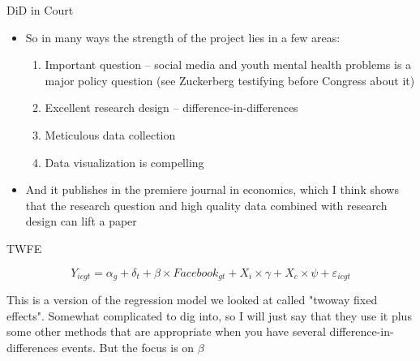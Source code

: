 \documentclass{beamer}
\begin{document}
\begin{frame}{DiD in Court}

\begin{itemize}

\item So in many ways the strength of the project lies in a few areas:
	\begin{enumerate}
	\item Important question -- social media and youth mental health problems is a major policy question (see Zuckerberg testifying before Congress about it)
	\item Excellent research design -- difference-in-differences
	\item Meticulous data collection
	\item Data visualization is compelling
	\end{enumerate}
\item And it publishes in the premiere journal in economics, which I think shows that the research question and high quality data combined with research design can lift a paper

\end{itemize}

\end{frame}







\begin{frame}{TWFE}

\begin{equation}
Y_{icgt} = \alpha_g + \delta_t + \beta \times Facebook_{gt} + X_i \times \gamma + X_c \times \psi + \varepsilon_{icgt}
\end{equation}

\bigskip

This is a version of the regression model we looked at called "twoway fixed effects".  Somewhat complicated to dig into, so I will just say that they use it plus some other methods that are appropriate when you have several difference-in-differences events.  But the focus is on $\beta$

\end{frame}
\end{document}
